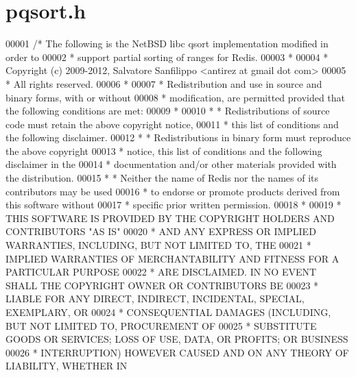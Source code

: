 \hypertarget{pqsort_8h_source}{}\section{pqsort.\+h}
\label{pqsort_8h_source}

\begin{DoxyCode}
00001 \textcolor{comment}{/* The following is the NetBSD libc qsort implementation modified in order to}
00002 \textcolor{comment}{ * support partial sorting of ranges for Redis.}
00003 \textcolor{comment}{ *}
00004 \textcolor{comment}{ * Copyright (c) 2009-2012, Salvatore Sanfilippo <antirez at gmail dot com>}
00005 \textcolor{comment}{ * All rights reserved.}
00006 \textcolor{comment}{ *}
00007 \textcolor{comment}{ * Redistribution and use in source and binary forms, with or without}
00008 \textcolor{comment}{ * modification, are permitted provided that the following conditions are met:}
00009 \textcolor{comment}{ *}
00010 \textcolor{comment}{ *   * Redistributions of source code must retain the above copyright notice,}
00011 \textcolor{comment}{ *     this list of conditions and the following disclaimer.}
00012 \textcolor{comment}{ *   * Redistributions in binary form must reproduce the above copyright}
00013 \textcolor{comment}{ *     notice, this list of conditions and the following disclaimer in the}
00014 \textcolor{comment}{ *     documentation and/or other materials provided with the distribution.}
00015 \textcolor{comment}{ *   * Neither the name of Redis nor the names of its contributors may be used}
00016 \textcolor{comment}{ *     to endorse or promote products derived from this software without}
00017 \textcolor{comment}{ *     specific prior written permission.}
00018 \textcolor{comment}{ *}
00019 \textcolor{comment}{ * THIS SOFTWARE IS PROVIDED BY THE COPYRIGHT HOLDERS AND CONTRIBUTORS "AS IS"}
00020 \textcolor{comment}{ * AND ANY EXPRESS OR IMPLIED WARRANTIES, INCLUDING, BUT NOT LIMITED TO, THE}
00021 \textcolor{comment}{ * IMPLIED WARRANTIES OF MERCHANTABILITY AND FITNESS FOR A PARTICULAR PURPOSE}
00022 \textcolor{comment}{ * ARE DISCLAIMED. IN NO EVENT SHALL THE COPYRIGHT OWNER OR CONTRIBUTORS BE}
00023 \textcolor{comment}{ * LIABLE FOR ANY DIRECT, INDIRECT, INCIDENTAL, SPECIAL, EXEMPLARY, OR}
00024 \textcolor{comment}{ * CONSEQUENTIAL DAMAGES (INCLUDING, BUT NOT LIMITED TO, PROCUREMENT OF}
00025 \textcolor{comment}{ * SUBSTITUTE GOODS OR SERVICES; LOSS OF USE, DATA, OR PROFITS; OR BUSINESS}
00026 \textcolor{comment}{ * INTERRUPTION) HOWEVER CAUSED AND ON ANY THEORY OF LIABILITY, WHETHER IN}

\end{DoxyCode}
